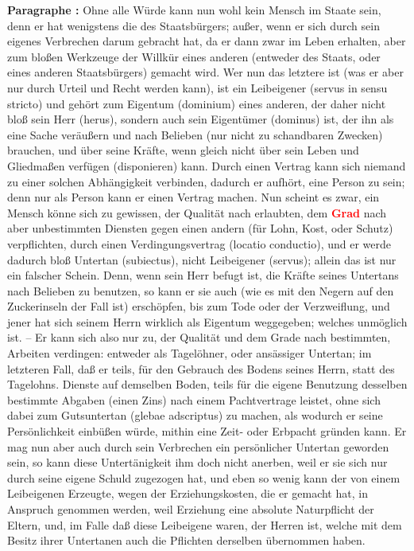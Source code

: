 \documentclass[a4paper,12pt,twoside]{book}
\newcommand{\match}[1]{\textcolor{red}{\textbf{#1}}}
\begin{document}
	\textbf{Paragraphe : }Ohne alle Würde kann nun wohl kein Mensch im Staate sein, denn er hat wenigstens die des Staatsbürgers; außer, wenn er sich durch sein eigenes Verbrechen darum gebracht hat, da er dann zwar im Leben erhalten, aber zum bloßen Werkzeuge der Willkür eines anderen (entweder des Staats, oder eines anderen Staatsbürgers) gemacht wird. Wer nun das letztere ist (was er aber nur durch Urteil und Recht werden kann), ist ein Leibeigener (servus in sensu stricto) und gehört zum Eigentum (dominium) eines anderen, der daher nicht bloß sein Herr (herus), sondern auch sein Eigentümer (dominus) ist, der ihn als eine Sache veräußern und nach Belieben (nur nicht zu schandbaren Zwecken) brauchen, und über seine Kräfte, wenn gleich nicht über sein Leben und Gliedmaßen verfügen (disponieren) kann. Durch einen Vertrag kann sich niemand zu einer solchen Abhängigkeit verbinden, dadurch er aufhört, eine Person zu sein; denn nur als Person kann er einen Vertrag machen. Nun scheint es zwar, ein Mensch könne sich zu gewissen, der Qualität nach erlaubten, dem \match{Grad} nach aber unbestimmten Diensten gegen einen andern (für Lohn, Kost, oder Schutz) verpflichten, durch einen Verdingungsvertrag (locatio conductio), und er werde dadurch bloß Untertan (subiectus), nicht Leibeigener (servus); allein das ist nur ein falscher Schein. Denn, wenn sein Herr befugt ist, die Kräfte seines Untertans nach Belieben zu benutzen, so kann er sie auch (wie es mit den Negern auf den Zuckerinseln der Fall ist) erschöpfen, bis zum Tode oder der Verzweiflung, und jener hat sich seinem Herrn wirklich als Eigentum weggegeben; welches unmöglich ist. – Er kann sich also nur zu, der Qualität und dem Grade nach bestimmten, Arbeiten verdingen: entweder als Tagelöhner, oder ansässiger Untertan; im letzteren Fall, daß er teils, für den Gebrauch des Bodens seines Herrn, statt des Tagelohns. Dienste auf demselben Boden, teils für die eigene Benutzung  desselben bestimmte Abgaben (einen Zins) nach einem Pachtvertrage leistet, ohne sich dabei zum Gutsuntertan (glebae adscriptus) zu machen, als wodurch er seine Persönlichkeit einbüßen würde, mithin eine Zeit- oder Erbpacht gründen kann. Er mag nun aber auch durch sein Verbrechen ein persönlicher Untertan geworden sein, so kann diese Untertänigkeit ihm doch nicht anerben, weil er sie sich nur durch seine eigene Schuld zugezogen hat, und eben so wenig kann der von einem Leibeigenen Erzeugte, wegen der Erziehungskosten, die er gemacht hat, in Anspruch genommen werden, weil Erziehung eine absolute Naturpflicht der Eltern, und, im Falle daß diese Leibeigene waren, der Herren ist, welche mit dem Besitz ihrer Untertanen auch die Pflichten derselben übernommen haben. 
	
\end{document}
